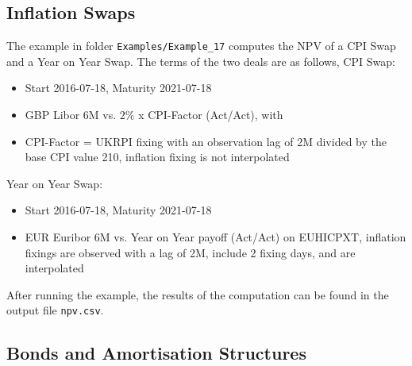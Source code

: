 \documentclass[12pt, a4paper]{article}
\begin{document}
\subsection{Inflation Swaps}

The example in folder {\tt Examples/Example\_17} computes the NPV of a CPI Swap and a Year on Year Swap. The terms of
the two deals are as follows, CPI Swap:

\begin{itemize}
\item Start 2016-07-18, Maturity 2021-07-18
\item GBP Libor 6M vs. $2\%$ x CPI-Factor (Act/Act), with
\item CPI-Factor = UKRPI fixing with an observation lag of 2M divided by the base CPI value 210, inflation fixing is not
  interpolated
\end{itemize}

Year on Year Swap:

\begin{itemize}
\item Start 2016-07-18, Maturity 2021-07-18
\item EUR Euribor 6M vs. Year on Year payoff (Act/Act) on EUHICPXT, inflation fixings are observed with a lag of 2M,
  include 2 fixing days, and are interpolated
\end{itemize}

After running the example, the results of the computation can be found in the output file {\tt npv.csv}.


\subsection{Bonds and Amortisation Structures}
\end{document}
